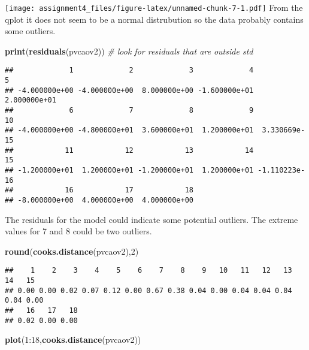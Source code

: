 \documentclass[11pt,]{article}
\newenvironment{Shaded}{\begin{snugshade}}{\end{snugshade}}
\newcommand{\KeywordTok}[1]{\textcolor[rgb]{0.13,0.29,0.53}{\textbf{{#1}}}}
\newcommand{\DecValTok}[1]{\textcolor[rgb]{0.00,0.00,0.81}{{#1}}}
\newcommand{\CommentTok}[1]{\textcolor[rgb]{0.56,0.35,0.01}{\textit{{#1}}}}
\newcommand{\NormalTok}[1]{{#1}}
\begin{document}
\texttt{[image: assignment4\_files/figure-latex/unnamed-chunk-7-1.pdf]}
From the qplot it does not seem to be a normal distrubution so the data
probably contains some outliers.

\begin{Shaded}
\begin{Highlighting}[]
\KeywordTok{print}\NormalTok{(}\KeywordTok{residuals}\NormalTok{(pvcaov2)) }\CommentTok{# look for residuals that are outside std}
\end{Highlighting}
\end{Shaded}

\begin{verbatim}
##             1             2             3             4             5 
## -4.000000e+00 -4.000000e+00  8.000000e+00 -1.600000e+01  2.000000e+01 
##             6             7             8             9            10 
## -4.000000e+00 -4.800000e+01  3.600000e+01  1.200000e+01  3.330669e-15 
##            11            12            13            14            15 
## -1.200000e+01  1.200000e+01 -1.200000e+01  1.200000e+01 -1.110223e-16 
##            16            17            18 
## -8.000000e+00  4.000000e+00  4.000000e+00
\end{verbatim}

The residuals for the model could indicate some potential outliers. The
extreme values for 7 and 8 could be two outliers.

\begin{Shaded}
\begin{Highlighting}[]
\KeywordTok{round}\NormalTok{(}\KeywordTok{cooks.distance}\NormalTok{(pvcaov2),}\DecValTok{2}\NormalTok{)}
\end{Highlighting}
\end{Shaded}

\begin{verbatim}
##    1    2    3    4    5    6    7    8    9   10   11   12   13   14   15 
## 0.00 0.00 0.02 0.07 0.12 0.00 0.67 0.38 0.04 0.00 0.04 0.04 0.04 0.04 0.00 
##   16   17   18 
## 0.02 0.00 0.00
\end{verbatim}

\begin{Shaded}
\begin{Highlighting}[]
\KeywordTok{plot}\NormalTok{(}\DecValTok{1}\NormalTok{:}\DecValTok{18}\NormalTok{,}\KeywordTok{cooks.distance}\NormalTok{(pvcaov2))}
\end{Highlighting}
\end{Shaded}
\end{document}
